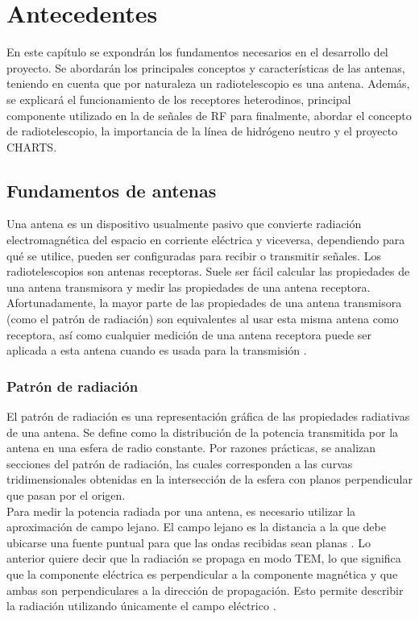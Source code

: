 \chapter{Antecedentes}

En este capítulo se expondrán los fundamentos necesarios en el desarrollo del proyecto. Se abordarán los principales conceptos y características de las antenas, teniendo en cuenta que por naturaleza un radiotelescopio es una antena. Además, se explicará el funcionamiento de los receptores heterodinos, principal componente utilizado en la de señales de RF para finalmente, abordar el concepto de radiotelescopio, la importancia de la línea de hidrógeno neutro y el proyecto CHARTS.\\

\section{Fundamentos de antenas}

Una antena es un dispositivo usualmente pasivo que convierte radiación electromagnética del espacio en corriente eléctrica y viceversa, dependiendo para qué se utilice, pueden ser configuradas para recibir o transmitir señales. Los radiotelescopios son antenas receptoras. Suele ser fácil calcular las propiedades de una antena transmisora y medir las propiedades de una antena receptora. Afortunadamente, la mayor parte de las propiedades de una antena transmisora (como el patrón de radiación) son equivalentes al usar esta misma antena como receptora, así como cualquier medición de una antena receptora puede ser aplicada a esta antena cuando es usada para la transmisión \cite{Ransom2016}.\\

\subsection{Patrón de radiación}

El patrón de radiación es una representación gráfica de las propiedades radiativas de una antena. Se define como la distribución de la potencia transmitida por la antena en una esfera de radio constante. Por razones prácticas, se analizan secciones del patrón de radiación, las cuales corresponden a las curvas tridimensionales obtenidas en la intersección de la esfera con planos perpendicular que pasan por el origen.\\

Para medir la potencia radiada por una antena, es necesario utilizar la aproximación de campo lejano. El campo lejano es la distancia a la que debe ubicarse una fuente puntual para que las ondas recibidas sean planas \cite{Ransom2016}. Lo anterior quiere decir que la radiación se propaga en modo TEM, lo que significa que la componente eléctrica es perpendicular a la componente magnética y que ambas son perpendiculares a la dirección de propagación. Esto permite describir la radiación utilizando únicamente el campo eléctrico \cite{Astudillo2014}.\\

